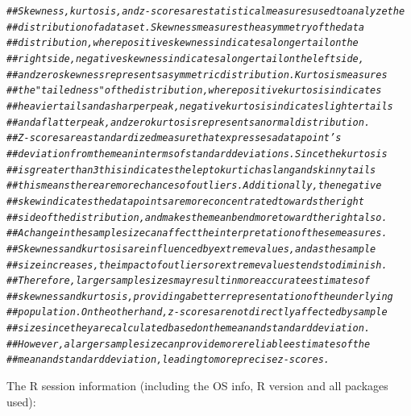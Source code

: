 \documentclass{article}\usepackage[]{graphicx}\usepackage[]{xcolor}
\makeatletter
\newcommand{\hlcom}[1]{\textcolor[rgb]{0.678,0.584,0.686}{\textit{#1}}}%
\newenvironment{kframe}{%
 \def\at@end@of@kframe{}%
 \ifinner\ifhmode%
  \def\at@end@of@kframe{\end{minipage}}%
  \begin{minipage}{\columnwidth}%
 \fi\fi%
 \def\FrameCommand##1{\hskip\@totalleftmargin \hskip-\fboxsep
 \colorbox{shadecolor}{##1}\hskip-\fboxsep
     \hskip-\linewidth \hskip-\@totalleftmargin \hskip\columnwidth}%
 \MakeFramed {\advance\hsize-\width
   \@totalleftmargin\z@ \linewidth\hsize
   \@setminipage}}%
 {\par\unskip\endMakeFramed%
 \at@end@of@kframe}
\newenvironment{knitrout}{}{} %
\makeatother
\begin{document}
\begin{knitrout}
\begin{kframe}
\begin{alltt}
\hlcom{## Skewness, kurtosis, and z-scores are statistical measures used to analyze the }
\hlcom{## distribution of a dataset. Skewness measures the asymmetry of the data }
\hlcom{## distribution, where positive skewness indicates a longer tail on the }
\hlcom{## right side, negative skewness indicates a longer tail on the left side, }
\hlcom{## and zero skewness represents a symmetric distribution. Kurtosis measures }
\hlcom{## the "tailedness" of the distribution, where positive kurtosis indicates }
\hlcom{## heavier tails and a sharper peak, negative kurtosis indicates lighter tails }
\hlcom{## and a flatter peak, and zero kurtosis represents a normal distribution. }
\hlcom{## Z-scores are a standardized measure that expresses a data point's }
\hlcom{## deviation from the mean in terms of standard deviations.  Since the kurtosis}
\hlcom{## is greater than 3 this indicates the leptokurtic has lang and skinny tails}
\hlcom{## this means there are more chances of outliers.  Additionally, the negative}
\hlcom{## skew indicates the data points are more concentrated towards the right}
\hlcom{## side of the distribution, and makes the mean bend more toward the right also.}
\hlcom{## A change in the sample size can affect the interpretation of these measures. }
\hlcom{## Skewness and kurtosis are influenced by extreme values, and as the sample }
\hlcom{## size increases, the impact of outliers or extreme values tends to diminish. }
\hlcom{##  Therefore, larger sample sizes may result in more accurate estimates of }
\hlcom{## skewness and kurtosis, providing a better representation of the underlying }
\hlcom{## population. On the other hand, z-scores are not directly affected by sample }
\hlcom{## size since they are calculated based on the mean and standard deviation. }
\hlcom{## However, a larger sample size can provide more reliable estimates of the }
\hlcom{## mean and standard deviation, leading to more precise z-scores.}
\end{alltt}
\end{kframe}
\end{knitrout}

The R session information (including the OS info, R version and all
packages used):
\end{document}

